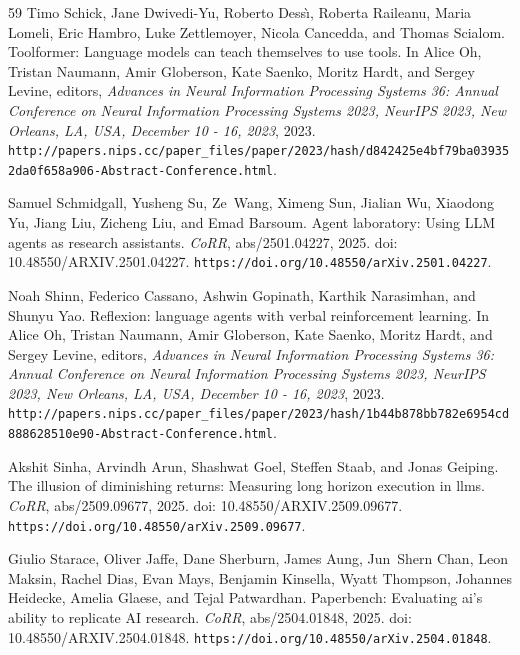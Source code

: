 \documentclass{llmxive}
\providecommand{\url}[1]{\texttt{#1}}
\providecommand{\doi}[1]{doi: #1}
\begin{document}
\begin{thebibliography}{59}
Timo Schick, Jane Dwivedi{-}Yu, Roberto Dess{\`{\i}}, Roberta Raileanu, Maria Lomeli, Eric Hambro, Luke Zettlemoyer, Nicola Cancedda, and Thomas Scialom.
\newblock Toolformer: Language models can teach themselves to use tools.
\newblock In Alice Oh, Tristan Naumann, Amir Globerson, Kate Saenko, Moritz Hardt, and Sergey Levine, editors, \emph{Advances in Neural Information Processing Systems 36: Annual Conference on Neural Information Processing Systems 2023, NeurIPS 2023, New Orleans, LA, USA, December 10 - 16, 2023}, 2023.
\newblock \url{http://papers.nips.cc/paper\_files/paper/2023/hash/d842425e4bf79ba039352da0f658a906-Abstract-Conference.html}.

Samuel Schmidgall, Yusheng Su, Ze~Wang, Ximeng Sun, Jialian Wu, Xiaodong Yu, Jiang Liu, Zicheng Liu, and Emad Barsoum.
\newblock Agent laboratory: Using {LLM} agents as research assistants.
\newblock \emph{CoRR}, abs/2501.04227, 2025.
\newblock \doi{10.48550/ARXIV.2501.04227}.
\newblock \url{https://doi.org/10.48550/arXiv.2501.04227}.

Noah Shinn, Federico Cassano, Ashwin Gopinath, Karthik Narasimhan, and Shunyu Yao.
\newblock Reflexion: language agents with verbal reinforcement learning.
\newblock In Alice Oh, Tristan Naumann, Amir Globerson, Kate Saenko, Moritz Hardt, and Sergey Levine, editors, \emph{Advances in Neural Information Processing Systems 36: Annual Conference on Neural Information Processing Systems 2023, NeurIPS 2023, New Orleans, LA, USA, December 10 - 16, 2023}, 2023.
\newblock \url{http://papers.nips.cc/paper\_files/paper/2023/hash/1b44b878bb782e6954cd888628510e90-Abstract-Conference.html}.

Akshit Sinha, Arvindh Arun, Shashwat Goel, Steffen Staab, and Jonas Geiping.
\newblock The illusion of diminishing returns: Measuring long horizon execution in llms.
\newblock \emph{CoRR}, abs/2509.09677, 2025.
\newblock \doi{10.48550/ARXIV.2509.09677}.
\newblock \url{https://doi.org/10.48550/arXiv.2509.09677}.

Giulio Starace, Oliver Jaffe, Dane Sherburn, James Aung, Jun~Shern Chan, Leon Maksin, Rachel Dias, Evan Mays, Benjamin Kinsella, Wyatt Thompson, Johannes Heidecke, Amelia Glaese, and Tejal Patwardhan.
\newblock Paperbench: Evaluating ai's ability to replicate {AI} research.
\newblock \emph{CoRR}, abs/2504.01848, 2025.
\newblock \doi{10.48550/ARXIV.2504.01848}.
\newblock \url{https://doi.org/10.48550/arXiv.2504.01848}.


\end{thebibliography}
\end{document}
